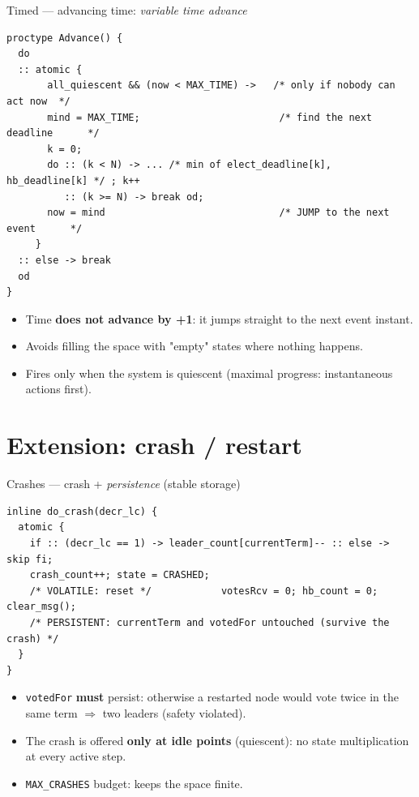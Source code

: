 \documentclass{beamer}
\begin{document}
\begin{frame}[fragile]{Timed — advancing time: \emph{variable time advance}}
\begin{lstlisting}[style=promela]
proctype Advance() {
  do
  :: atomic {
       all_quiescent && (now < MAX_TIME) ->   /* only if nobody can act now  */
       mind = MAX_TIME;                        /* find the next deadline      */
       k = 0;
       do :: (k < N) -> ... /* min of elect_deadline[k], hb_deadline[k] */ ; k++
          :: (k >= N) -> break od;
       now = mind                              /* JUMP to the next event      */
     }
  :: else -> break
  od
}
\end{lstlisting}
\scriptsize{}
  \begin{itemize}
    \item Time \textbf{does not advance by +1}: it jumps straight to the next event instant.
    \item Avoids filling the space with "empty" states where nothing happens.
    \item Fires only when the system is quiescent (maximal progress: instantaneous actions first).
  \end{itemize}
\end{frame}

\section{Extension: crash / restart}

\begin{frame}[fragile]{Crashes — crash + \emph{persistence} (stable storage)}
\begin{lstlisting}[style=promela]
inline do_crash(decr_lc) {
  atomic {
    if :: (decr_lc == 1) -> leader_count[currentTerm]-- :: else -> skip fi;
    crash_count++; state = CRASHED;
    /* VOLATILE: reset */            votesRcv = 0; hb_count = 0; clear_msg();
    /* PERSISTENT: currentTerm and votedFor untouched (survive the crash) */
  }
}
\end{lstlisting}
  \begin{itemize}
    \item \texttt{votedFor} \textbf{must} persist: otherwise a restarted node would vote twice
          in the same term $\Rightarrow$ two leaders (safety violated).
    \item The crash is offered \textbf{only at idle points} (quiescent): no state multiplication
          at every active step.
    \item \texttt{MAX\_CRASHES} budget: keeps the space finite.
  \end{itemize}
\end{frame}
\end{document}
